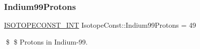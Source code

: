 \subsubsection{\texorpdfstring{Indium99\+Protons}{Indium99Protons}}
{\footnotesize\ttfamily \mbox{\hyperlink{group___isotope_const-_macros_ga5f18360b3e99483a35c32d789e62621c}{I\+S\+O\+T\+O\+P\+E\+C\+O\+N\+S\+T\+\_\+\+I\+NT}} Isotope\+Const\+::\+Indium99\+Protons = 49}

\$ \$ Protons in Indium-\/99. 